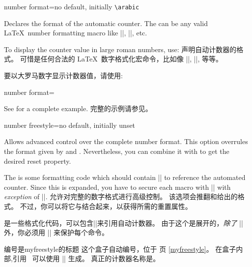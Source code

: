 \begin{newTcbKey}{number format}{=}{no default, initially \texttt{\textbackslash arabic}}
\begin{stripedbox}
Declares the format of the automatic counter. 
The  can be any valid \LaTeX\ number formatting macro like |\arabic|, |\roman|, etc.\par
To display the counter value in large roman numbers, use:
\tcblower
声明自动计数器的格式。%
可惜是任何合法的 \LaTeX\ 数字格式化宏命令，比如像 |\arabic|, |\roman|, 等等。\par
要以大罗马数字显示计数器值，请使用:
\end{stripedbox}

\begin{dispListing}
number format=\Roman
\end{dispListing}
\begin{stripedbox}
See  for a complete example.
\tcblower
完整的示例请参见。
\end{stripedbox}
\end{newTcbKey}

\begin{newTcbKey}{number freestyle}{=}{no default, initially unset}
\begin{stripedbox}
Allows advanced control over the complete number format.%
This option overrules the format given by  and .
Nevertheless, you can combine it with  to get the desired reset property.\par
The  is some formatting code which should contain |\tcbcounter| to reference the automated counter.
Since this  is expanded, you have to secure each macro with |\noexpand| with \emph{exception} of |\tcbcounter|.
\tcblower
允许对完整的数字格式进行高级控制。%
该选项会推翻和给出的格式。
不过，你可以将它与结合起来，以获得所需的重置属性。\par
{}是一些格式化代码，可以包含|\tcbcounter|来引用自动计数器。
由于这个是展开的，\emph{除了} |\tcbcounter| 外，你必须用 |\noexpand| 来保护每个命令。
\end{stripedbox}


\begin{dispExample}
\begin{phbox}[label={myfreestyle}]{编号是myfreestyle的标题}
这个盒子自动编号，位于 \pageref{myfreestyle} 页 \ref{myfreestyle}。%
在盒子内部,引用 \thetcbcounter\ 可以使用 |\thetcbcounter| 生成。%
真正的计数器名称是\texttt{\tcbcounter}。
\end{phbox}
\end{dispExample}
\end{newTcbKey}

